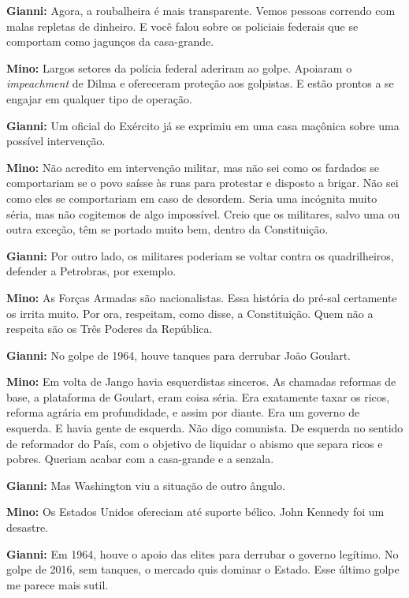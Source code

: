 \textbf{Gianni:} Agora, a roubalheira é mais transparente. Vemos pessoas
correndo com malas repletas de dinheiro. E você falou sobre os policiais
federais que se comportam como jagunços da casa-grande.

\textbf{Mino:} Largos setores da polícia federal aderiram ao golpe.
Apoiaram o \emph{impeachment} de Dilma e ofereceram proteção aos
golpistas. E estão prontos a se engajar em qualquer tipo de operação.

\textbf{Gianni:} Um oficial do Exército já se exprimiu em uma casa
maçônica sobre uma possível intervenção.

\textbf{Mino:} Não acredito em intervenção militar, mas não sei como os
fardados se comportariam se o povo saísse às ruas para protestar e
disposto a brigar. Não sei como eles se comportariam em caso de
desordem. Seria uma incógnita muito séria, mas não cogitemos de algo
impossível. Creio que os militares, salvo uma ou outra exceção, têm se
portado muito bem, dentro da Constituição.

\textbf{Gianni:} Por outro lado, os militares poderiam se voltar contra
os quadrilheiros, defender a Petrobras, por exemplo.

\textbf{Mino:} As Forças Armadas são nacionalistas. Essa história do
pré-sal certamente os irrita muito. Por ora, respeitam, como disse, a
Constituição. Quem não a respeita são os Três Poderes da República.

\protect\hypertarget{_Hlk498086306}{}{}\textbf{Gianni:} No golpe de
1964, houve tanques para derrubar João Goulart.

\textbf{Mino:} Em volta de Jango havia esquerdistas sinceros. As
chamadas reformas de base, a plataforma de Goulart, eram coisa séria.
Era exatamente taxar os ricos, reforma agrária em profundidade, e assim
por diante. Era um governo de esquerda. E havia gente de esquerda. Não
digo comunista. De esquerda no sentido de reformador do País, com o
objetivo de liquidar o abismo que separa ricos e pobres. Queriam acabar
com a casa-grande e a senzala.

\textbf{Gianni:} Mas Washington viu a situação de outro ângulo.

\textbf{Mino:} Os Estados Unidos ofereciam até suporte bélico. John
Kennedy foi um desastre.

\textbf{Gianni:} Em 1964, houve o apoio das elites para derrubar o
governo legítimo. No golpe de 2016, sem tanques, o mercado quis dominar
o Estado. Esse último golpe me parece mais sutil.

